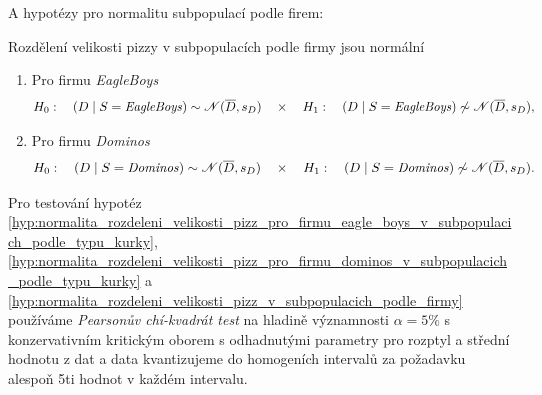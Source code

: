 \documentclass[czech]{article}
\newcommand\against{\ensuremath{\quad\times\quad}}
\begin{document}
A hypotézy pro normalitu subpopulací podle firem:

\begin{hypothesis}
	\label{hyp:normalita_rozdeleni_velikosti_pizz_v_subpopulacich_podle_firmy}
	Rozdělení velikosti pizzy v subpopulacích podle firmy jsou normální
	\begin{enumerate}[label=(\alph*)]
		\item Pro firmu \emph{EagleBoys}
		      \label{hyp:normalita_rozdeleni_velikosti_pizz_v_subpopulacich_podle_firmy_eb}
		      \[
			      H_0: \quad (D \mid S = \text{\emph{EagleBoys}}) \sim
			      \mathscr{N}(\overline{D}, s_D) \against H_1: \quad (D \mid S =
			      \text{\emph{EagleBoys}}) \not\sim \mathscr{N}(\overline{D},
			      s_D),
		      \]
		\item Pro firmu \emph{Dominos}
		      \label{hyp:normalita_rozdeleni_velikosti_pizz_v_subpopulacich_podle_firmy_d}
		      \[
			      H_0: \quad (D \mid S = \text{\emph{Dominos}}) \sim
			      \mathscr{N}(\overline{D}, s_D) \against H_1: \quad (D \mid S = \text{\emph{Dominos}}) \not\sim \mathscr{N}(\overline{D},
			      s_D).
		      \]
	\end{enumerate}
\end{hypothesis}

Pro testování hypotéz
\ref{hyp:normalita_rozdeleni_velikosti_pizz_pro_firmu_eagle_boys_v_subpopulacich_podle_typu_kurky},
\ref{hyp:normalita_rozdeleni_velikosti_pizz_pro_firmu_dominos_v_subpopulacich_podle_typu_kurky} a
\ref{hyp:normalita_rozdeleni_velikosti_pizz_v_subpopulacich_podle_firmy} používáme \emph{Pearsonův
	chí-kvadrát test} na hladině významnosti \(\alpha = 5 \%\) s konzervativním kritickým oborem s odhadnutými parametry pro rozptyl a
střední hodnotu z dat a data kvantizujeme do homogeních intervalů za požadavku alespoň 5ti
hodnot v každém intervalu.
\end{document}
